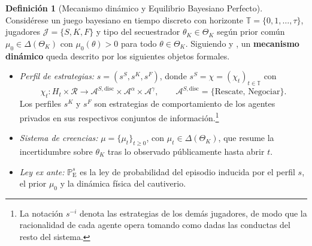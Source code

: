 \documentclass[12pt]{article}
\providecommand{\textcite}{\citet}
\theoremstyle{definition}
\newtheorem{definition}[theorem]{Definición}
\theoremstyle{remark}
\newcommand{\ProbE}{\mathbb{P}_{\mathrm{E}}}
\newcommand{\1}{\mathbf{1}}
\begin{document}
\begin{definition}[Mecanismo dinámico y Equilibrio Bayesiano Perfecto]
\label{def:pbe-mechanism}
Considérese un juego bayesiano en tiempo discreto con horizonte $\mathbb{T}=\{0,1,\ldots,\tau\}$, jugadores $\mathcal{J}=\{S,K,F\}$ y tipo del secuestrador $\theta_K\in\Theta_K$ según prior común $\mu_0\in\Delta(\Theta_K)$ con $\mu_0(\theta)>0$ para todo $\theta\in\Theta_K$. Siguiendo \textcite{FudenbergTirole1991} y \textcite{KrepsWilson1982}, un \textbf{mecanismo dinámico} queda descrito por los siguientes objetos formales.

\begin{itemize}
  \item \emph{Perfil de estrategias:} $s=(s^S,s^K,s^F)$, donde $s^S=\chi=(\chi_t)_{t\in\mathbb{T}}$ con
  \[
    \chi_t \colon H_t\times\mathcal{R}
    \longrightarrow \mathcal{A}^{S,\mathrm{disc}}\times\mathcal{A}^{\alpha}\times\mathcal{A}^{\gamma},
    \qquad
    \mathcal{A}^{S,\mathrm{disc}}=\{\text{Rescate},\,\text{Negociar}\}.
  \]
  Los perfiles $s^K$ y $s^F$ son estrategias de comportamiento de los agentes privados en sus respectivos conjuntos de información.\footnote{La notación $s^{-i}$ denota las estrategias de los demás jugadores, de modo que la racionalidad de cada agente opera tomando como dadas las conductas del resto del sistema.}
  \item \emph{Sistema de creencias:} $\mu=\{\mu_t\}_{t\ge 0}$, con $\mu_t\in\Delta(\Theta_K)$, que resume la incertidumbre sobre $\theta_K$ tras lo observado públicamente hasta abrir $t$.
  \item \emph{Ley ex ante:} $\ProbE^s$ es la ley de probabilidad del episodio inducida por el perfil $s$, el prior $\mu_0$ y la dinámica física del cautiverio.
\end{itemize}


\end{definition}
\end{document}

